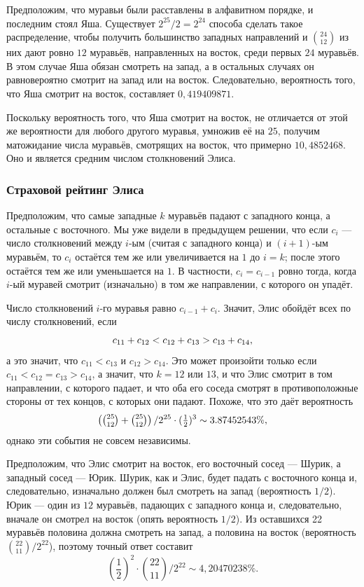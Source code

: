 Предположим, что муравьи были расставлены в алфавитном порядке, и последним стоял Яша.
Существует $2^{25}/2=2^{24}$ способа сделать такое распределение, чтобы получить большинство западных направлений и $\binom{24}{12}$
из них дают ровно $12$ муравьёв, направленных на восток, среди первых $24$ муравьёв.
В этом случае Яша обязан смотреть на запад,
а в остальных случаях он равновероятно смотрит на запад или на восток.
Следовательно, вероятность того, что Яша смотрит на восток, составляет
$0{,}419409871$.

Поскольку вероятность того, что Яша смотрит на восток, не отличается от этой же вероятности для любого другого муравья, умножив её на $25$, получим матожидание числа муравьёв, смотрящих на восток, что примерно $10{,}4852468$.
Оно и является средним числом столкновений Элиса.

\subsubsection*{Страховой рейтинг Элиса}

Предположим, что самые западные $k$ муравьёв падают с западного конца,
а остальные с восточного.
Мы уже видели в предыдущем решении, что если $c_i$ --- число столкновений между $i$-ым (считая с западного конца) и $(i + 1)$-ым муравьём, то $c_i$ остаётся тем же или увеличивается на $1$ до $i = k$; после этого остаётся тем же или уменьшается на $1$.
В частности, $c_i=c_{i-1}$ ровно тогда, когда $i$-ый муравей смотрит (изначально) в том же направлении, с которого он упадёт.

Число столкновений $i$-го муравья равно $c_{i-1}+c_{i}$.
Значит, Элис обойдёт всех по числу столкновений, если 
\[c_{11}+c_{12}\z<c_{12}\z+c_{13}\z>c_{13}\z+c_{14},\]
а это значит, что  $c_{11}<c_{13}$ и $c_{12}>c_{14}$.
Это может произойти только если 
$c_{11}<c_{12}=c_{13}>c_{14}$,
а значит, что $k = 12$ или $13$, и что Элис смотрит в том направлении, с которого падает,
и что оба его соседа смотрят в противоположные стороны от тех концов, с которых они падают.
Похоже, что это даёт вероятность 
\[\left(\tbinom{25}{12}+\tbinom{25}{12}\right)/2^{25}\cdot (\tfrac12)^3\sim 3.87452543\%,\]
однако эти события не совсем независимы.

Предположим, что Элис смотрит на восток, его восточный сосед --- Шурик, а западный сосед --- Юрик.
Шурик, как и Элис, будет падать с восточного конца и, следовательно, изначально должен был смотреть на запад (вероятность $1/2$).
Юрик --- один из $12$ муравьёв, падающих с западного конца и, следовательно, вначале он смотрел на восток (опять вероятность $1/2$).
Из оставшихся 22 муравьёв половина должна смотреть на запад, а половина на восток (вероятность $\binom{22}{11}/2^{22}$), поэтому точный ответ составит
\[\left(\frac12\right)^2\cdot\binom{22}{11}/2^{22}\sim 4{,}20470238\%.\]

